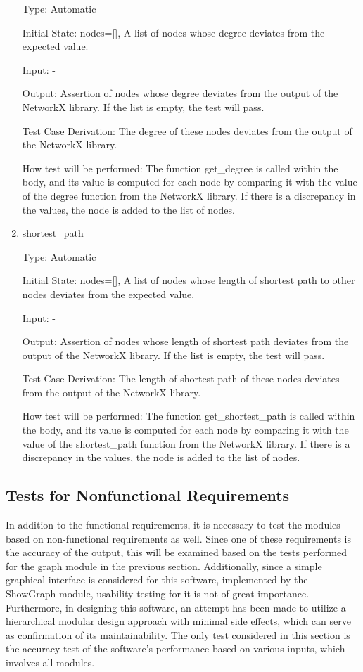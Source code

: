 \documentclass[12pt, titlepage]{article}
\begin{document}
\begin{enumerate}
Type: Automatic
					
Initial State: nodes=[], A list of nodes whose degree deviates from the expected value.
					
Input: -
					
Output: Assertion of nodes whose degree deviates from the output of the NetworkX library. If the list is empty, the test will pass.

Test Case Derivation: The degree of these nodes deviates from the output of the NetworkX library.

How test will be performed: 
The function {get\_degree} is called within the body, and its value is computed for each node by comparing it with the value of the {degree} function from the NetworkX library. If there is a discrepancy in the values, the node is added to the list of nodes.
					
\item{shortest\_path\\}

Type:  Automatic
					
Initial State: nodes=[], A list of nodes whose length of shortest path to other nodes deviates from the expected value.
					
Input: -
					
Output: Assertion of nodes whose length of shortest path deviates from the output of the NetworkX library. If the list is empty, the test will pass.

Test Case Derivation: The length of shortest path of these nodes deviates from the output of the NetworkX library.

How test will be performed: The function {get\_shortest\_path} is called within the body, and its value is computed for each node by comparing it with the value of the {shortest\_path} function from the NetworkX library. If there is a discrepancy in the values, the node is added to the list of nodes.


    
\end{enumerate}



\subsection{Tests for Nonfunctional Requirements}

In addition to the functional requirements, it is necessary to test the modules based on non-functional requirements as well. Since one of these requirements is the accuracy of the output, this will be examined based on the tests performed for the graph module in the previous section. Additionally, since a simple graphical interface is considered for this software, implemented by the ShowGraph module, usability testing for it is not of great importance. Furthermore, in designing this software, an attempt has been made to utilize a hierarchical modular design approach with minimal side effects, which can serve as confirmation of its maintainability. The only test considered in this section is the accuracy test of the software's performance based on various inputs, which involves all modules.
		
\end{document}
